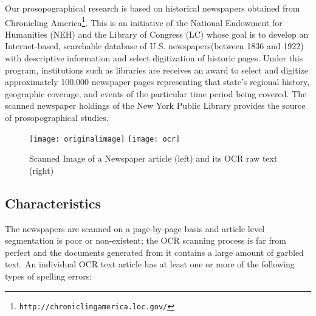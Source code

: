 Our prosopographical research is based on historical newspapers obtained from Chronicling America\footnote{\texttt{http://chroniclingamerica.loc.gov/}}. This is an
initiative of the National Endowment for Humanities (NEH) and the
Library of Congress (LC) whose goal is to develop an Internet-based, searchable database of U.S. newspapers(between
1836 and 1922) with descriptive information and select digitization of historic pages. Under this program, institutions such as libraries are receives an award to select and digitize approximately 100,000 newspaper pages representing that state's regional history, geographic coverage, and events of the particular time period being covered. The scanned newspaper holdings of the New York Public Library provides the source of prosopographical studies. 

\begin{figure*}
\texttt{[image: originalimage]}
\texttt{[image: ocr]}
\caption{Scanned Image of a Newspaper article (left) and its OCR raw text (right)}
\label{figure:1}
\end{figure*}

\subsection{Characteristics}
The newspapers are scanned on a page-by-page basis and article level
segmentation is poor or non-existent; the OCR scanning process is far
from perfect and the documents generated from it contains a large
amount of garbled text.
An individual OCR text article has at least one or more of the following types of spelling errors:

